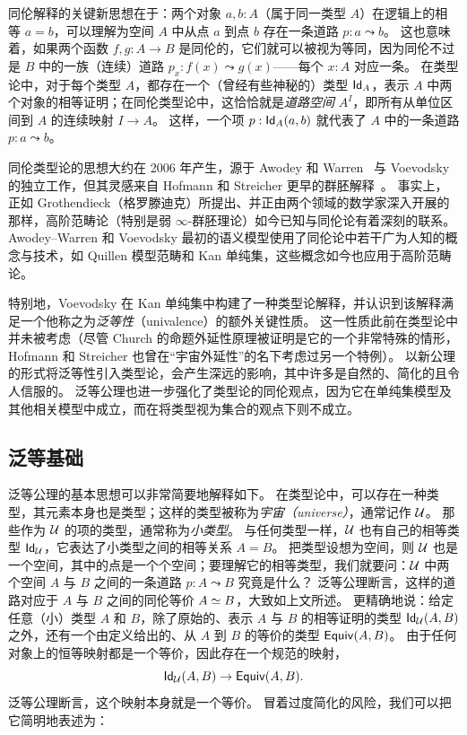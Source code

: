 同伦解释的关键新思想在于：两个对象 $a, b: A$（属于同一类型 $A$）在逻辑上的相等 $a = b$，可以理解为空间 $A$ 中从点 $a$ 到点 $b$ 存在一条道路 $p : a \leadsto b$。
这也意味着，如果两个函数 $f, g: A\to B$ 是同伦的，它们就可以被视为等同，因为同伦不过是 $B$ 中的一族（连续）道路 $p_x: f(x) \leadsto g(x)$——每个 $x:A$ 对应一条。
在类型论中，对于每个类型 $A$，都存在一个（曾经有些神秘的）类型 $\idtypevar{A}$，表示 $A$ 中两个对象的相等证明；在同伦类型论中，这恰恰就是\emph{道路空间} $A^I$，即所有从单位区间到 $A$ 的连续映射 $I\to A$。
%
%
%
%
这样，一个项 $p : \idtype[A]{a}{b}$ 就代表了 $A$ 中的一条道路 $p : a \leadsto b$。

同伦类型论的思想大约在 2006 年产生，源于 Awodey 和 Warren~\cite{AW} 与 Voevodsky~\cite{VV} 的独立工作，但其灵感来自 Hofmann 和 Streicher 更早的群胚解释~\cite{hs:gpd-typethy}。
事实上，正如 Grothendieck（格罗滕迪克）所提出、并正由两个领域的数学家深入开展的那样，高阶范畴论（特别是弱 $\infty$-群胚理论）如今已知与同伦论有着深刻的联系。
Awodey–Warren 和 Voevodsky 最初的语义模型使用了同伦论中若干广为人知的概念与技术，如 Quillen 模型范畴和 Kan 单纯集，这些概念如今也应用于高阶范畴论。
%
%

特别地，Voevodsky 在 Kan 单纯集中构建了一种类型论解释，并认识到该解释满足一个他称之为\emph{泛等性}（univalence）的额外关键性质。
这一性质此前在类型论中并未被考虑（尽管 Church 的命题外延性原理被证明是它的一个非常特殊的情形，Hofmann 和 Streicher 也曾在``宇宙外延性''的名下考虑过另一个特例）。
以新公理的形式将泛等性引入类型论，会产生深远的影响，其中许多是自然的、简化的且令人信服的。
泛等公理也进一步强化了类型论的同伦观点，因为它在单纯集模型及其他相关模型中成立，而在将类型视为集合的观点下则不成立。

\subsection*{泛等基础}

泛等公理的基本思想可以非常简要地解释如下。
在类型论中，可以存在一种类型，其元素本身也是类型；这样的类型被称为\emph{宇宙（universe）}，通常记作 $\UU$。
那些作为 $\UU$ 的项的类型，通常称为\emph{小类型}。%
%
与任何类型一样，$\UU$ 也有自己的相等类型 $\idtypevar{\UU}$，它表达了小类型之间的相等关系 $A = B$。
把类型设想为空间，则 $\UU$ 也是一个空间，其中的点是一个个空间；要理解它的相等类型，我们就要问：$\UU$ 中两个空间 $A$ 与 $B$ 之间的一条道路 $p : A \leadsto B$ 究竟是什么？
泛等公理断言，这样的道路对应于 $A$ 与 $B$ 之间的同伦等价 $\eqv A B$，大致如上文所述。
更精确地说：给定任意（小）类型 $A$ 和 $B$，除了原始的、表示 $A$ 与 $B$ 的相等证明的类型 $\idtype[\UU]AB$ 之外，还有一个由定义给出的、从 $A$ 到 $B$ 的等价的类型 $\texteqv AB$。
由于任何对象上的恒等映射都是一个等价，因此存在一个规范的映射，
\[\idtype[\UU]AB\to\texteqv AB.\]
泛等公理断言，这个映射本身就是一个等价。
冒着过度简化的风险，我们可以把它简明地表述为：

